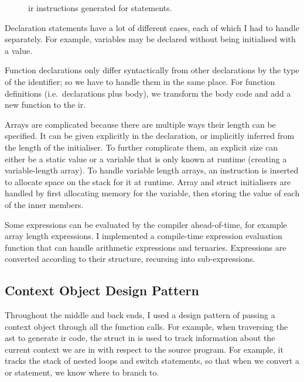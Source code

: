 \documentclass[00-main.tex]{subfiles}
\begin{document}
\begin{figure}[ht]
  \centering
  \caption{\gls{ir} instructions generated for  statements.}
  \label{fig:instr structure for switch statements} %
\end{figure}

Declaration statements have a lot of different cases, each of which I had to handle separately.
For example, variables may be declared without being initialised with a value.

Function declarations only differ syntactically from other declarations by the type of the identifier; so we have to handle them in the same place.
For function definitions (i.e.\ declarations plus body), we transform the body code and add a new function to the \gls{ir}.

Arrays are complicated because there are multiple ways their length can be specified.
It can be given explicitly in the declaration, or implicitly inferred from the length of the initialiser.
To further complicate them, an explicit size can either be a static value or a variable that is only known at runtime (creating a variable-length array).
To handle variable length arrays, an instruction is inserted to allocate space on the stack for it at runtime.
Array and struct initialisers are handled by first allocating memory for the variable, then storing the value of each of the inner members.


Some expressions can be evaluated by the compiler ahead-of-time, for example array length expressions.
I implemented a compile-time expression evaluation function that can handle arithmetic expressions and ternaries.
Expressions are converted according to their structure, recursing into sub-expressions.


\subsection{Context Object Design Pattern}\label{sec:impl:context object design pattern}

Throughout the middle and back ends, I used a design pattern of passing a context object through all the function calls.
For example, when traversing the \gls{ast} to generate \gls{ir} code, the  struct in  is used to track information about the current context we are in with respect to the source program.
For example, it tracks the stack of nested loops and switch statements, so that when we convert a  or  statement, we know where to branch to.
\end{document}
